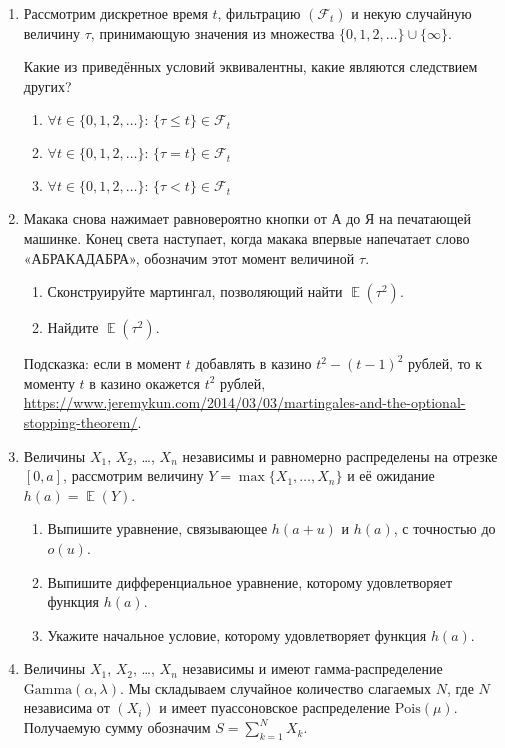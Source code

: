 \documentclass[12pt]{article}
\DeclareMathOperator{\E}{\mathbb{E}}
\newcommand{\dGamma}{\mathrm{Gamma}}
\newcommand{\dPois}{\mathrm{Pois}}
\begin{document}
\begin{enumerate}

\item Рассмотрим дискретное время $t$, фильтрацию $(\mathcal{F}_t)$ и некую случайную величину $\tau$, принимающую значения из множества $\{0, 1, 2, \dots\} \cup \{\infty\}$.

Какие из приведённых условий эквивалентны, какие являются следствием других?
\begin{enumerate}[label=\Alph*:]
    \item $\forall t \in \{0, 1, 2, \dots \}: \, \{\tau \leq t\} \in \mathcal{F}_t$
    \item $\forall t \in \{0, 1, 2, \dots \}: \, \{\tau = t\} \in \mathcal{F}_t$
    \item $\forall t \in \{0, 1, 2, \dots \}: \, \{\tau < t\} \in \mathcal{F}_t$
\end{enumerate}


\item Макака снова нажимает равновероятно кнопки от А до Я на печатающей машинке.
Конец света наступает, когда макака впервые напечатает слово «АБРАКАДАБРА»,
обозначим этот момент величиной $\tau$.

\begin{enumerate}
    \item Сконструируйте мартингал, позволяющий найти $\E(\tau^2)$.
    \item Найдите $\E(\tau^2)$.
\end{enumerate}

Подсказка: если в момент $t$ добавлять в казино $t^2 - (t-1)^2$ рублей, то к моменту $t$ в казино окажется $t^2$ рублей,
\url{https://www.jeremykun.com/2014/03/03/martingales-and-the-optional-stopping-theorem/}.


\item Величины $X_1$, $X_2$, \dots, $X_n$ независимы и равномерно распределены на отрезке $[0, a]$,
рассмотрим величину $Y = \max\{X_1, \dots, X_n\}$ и её ожидание $h(a) = \E(Y)$.
\begin{enumerate}
    \item Выпишите уравнение, связывающее $h(a + u)$ и $h(a)$, с точностью до $o(u)$.
    \item Выпишите дифференциальное уравнение, которому удовлетворяет функция $h(a)$.
    \item Укажите начальное условие, которому удовлетворяет функция $h(a)$.
\end{enumerate}


\item Величины $X_1$, $X_2$, \dots, $X_n$ независимы и имеют гамма-распределение $\dGamma(\alpha, \lambda)$.
Мы складываем случайное количество слагаемых $N$, где $N$ независима от $(X_i)$ и имеет пуассоновское распределение $\dPois(\mu)$.
Получаемую сумму обозначим $S = \sum_{k=1}^N X_k$.


\end{enumerate}
\end{document}
